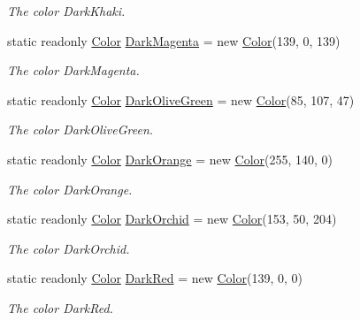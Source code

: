 \begin{DoxyCompactItemize}
\begin{DoxyCompactList}\small\item\em The color Dark\-Khaki. \end{DoxyCompactList}\item 
static readonly \hyperlink{struct_tri_devs_1_1_tri_engine2_d_1_1_color}{Color} \hyperlink{struct_tri_devs_1_1_tri_engine2_d_1_1_color_a8eccd0d13ae59ae20287a2907edef992}{Dark\-Magenta} = new \hyperlink{struct_tri_devs_1_1_tri_engine2_d_1_1_color}{Color}(139, 0, 139)
\begin{DoxyCompactList}\small\item\em The color Dark\-Magenta. \end{DoxyCompactList}\item 
static readonly \hyperlink{struct_tri_devs_1_1_tri_engine2_d_1_1_color}{Color} \hyperlink{struct_tri_devs_1_1_tri_engine2_d_1_1_color_a98c76300450131740a6f9db12b033187}{Dark\-Olive\-Green} = new \hyperlink{struct_tri_devs_1_1_tri_engine2_d_1_1_color}{Color}(85, 107, 47)
\begin{DoxyCompactList}\small\item\em The color Dark\-Olive\-Green. \end{DoxyCompactList}\item 
static readonly \hyperlink{struct_tri_devs_1_1_tri_engine2_d_1_1_color}{Color} \hyperlink{struct_tri_devs_1_1_tri_engine2_d_1_1_color_a68996d01f03c0337e3919bc30366be8a}{Dark\-Orange} = new \hyperlink{struct_tri_devs_1_1_tri_engine2_d_1_1_color}{Color}(255, 140, 0)
\begin{DoxyCompactList}\small\item\em The color Dark\-Orange. \end{DoxyCompactList}\item 
static readonly \hyperlink{struct_tri_devs_1_1_tri_engine2_d_1_1_color}{Color} \hyperlink{struct_tri_devs_1_1_tri_engine2_d_1_1_color_a41e6cb4d91cb0217e0df7e55a5c456db}{Dark\-Orchid} = new \hyperlink{struct_tri_devs_1_1_tri_engine2_d_1_1_color}{Color}(153, 50, 204)
\begin{DoxyCompactList}\small\item\em The color Dark\-Orchid. \end{DoxyCompactList}\item 
static readonly \hyperlink{struct_tri_devs_1_1_tri_engine2_d_1_1_color}{Color} \hyperlink{struct_tri_devs_1_1_tri_engine2_d_1_1_color_a88c65c8fafb453ec786842e75f30116f}{Dark\-Red} = new \hyperlink{struct_tri_devs_1_1_tri_engine2_d_1_1_color}{Color}(139, 0, 0)
\begin{DoxyCompactList}\small\item\em The color Dark\-Red. \end{DoxyCompactList}\item 

\end{DoxyCompactItemize}

